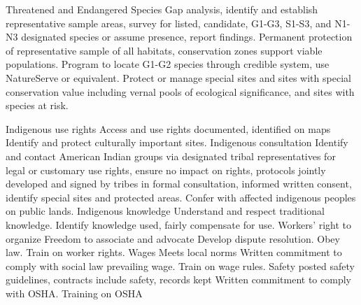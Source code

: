 \begin{table}
\textbar{}Threatened and Endangered Species \textbar{} Gap analysis,
identify and establish representative sample areas, survey for listed,
candidate, G1-G3, S1-S3, and N1-N3 designated species or assume
presence, report findings. Permanent protection of representative sample
of all habitats, conservation zones support viable populations.
\textbar{} Program to locate G1-G2 species through credible system, use
NatureServe or equivalent. Protect or manage special sites and sites
with special conservation value including vernal pools of ecological
significance, and sites with species at risk. \textbar{}

\textbar{}Indigenous use rights \textbar{} Access and use rights
documented, identified on maps \textbar{} Identify and protect
culturally important sites. \textbar{} \textbar{}Indigenous consultation
\textbar{} Identify and contact American Indian groups via designated
tribal representatives for legal or customary use rights, ensure no
impact on rights, protocols jointly developed and signed by tribes in
formal consultation, informed written consent, identify special sites
and protected areas. \textbar{} Confer with affected indigenous peoples
on public lands. \textbar{}Indigenous knowledge \textbar{} Understand
and respect traditional knowledge. \textbar{} Identify knowledge used,
fairly compensate for use. \textbar{} \textbar{}Workers' right to
organize \textbar{} Freedom to associate and advocate \textbar{} Develop
dispute resolution. \textbar{} Obey law. Train on worker rights.
\textbar{} \textbar{}Wages \textbar{} Meets local norms \textbar{}
Written commitment to comply with social law prevailing wage. Train on
wage rules. \textbar{} \textbar{}Safety \textbar{} posted safety
guidelines, contracts include safety, records kept \textbar{} Written
commitment to comply with OSHA. Training on OSHA \textbar{}

\end{table}
